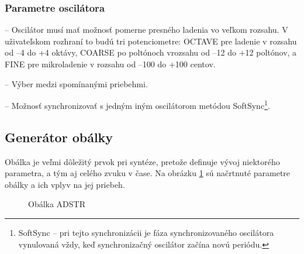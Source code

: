 \subsubsection{Parametre oscilátora}
\begin{description}
\setlength{\itemsep}{-0.5ex}
\item[Ladenie] -- Oscilátor musí mať možnosť pomerne presného ladenia vo veľkom rozsahu. V uživateľskom rozhraní to budú tri potenciometre: OCTAVE pre ladenie v rozsahu od --4 do +4 oktávy, COARSE po poltónoch vrozsahu od --12 do +12 poltónov, a FINE pre mikroladenie v rozsahu od --100 do +100 centov.
\item[Vlnový priebeh] -- Výber medzi spomínanými priebehmi.
\item[Synchronizácia] -- Možnosť synchronizovať s jedným iným oscilátorom metódou SoftSync\footnote{SoftSync -- pri tejto synchronizácii je fáza synchronizovaného oscilátora vynulovaná vždy, keď synchronizačný oscilátor začína novú periódu.}.
\end{description}

\subsection{Generátor obálky}

Obálka je veľmi dôležitý prvok pri syntéze, pretože definuje vývoj niektorého parametra, a tým aj celého zvuku v čase. Na obrázku \ref{obr08} sú načrtnuté parametre obálky a ich vplyv na jej priebeh.
\begin{figure}[h]
\centering
{}
\caption{\label{obr08} Obálka ADSTR}
\end{figure}

